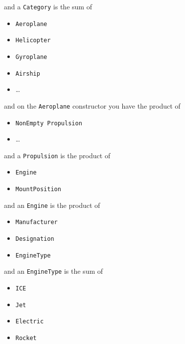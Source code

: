 \begin{frame}
\begin{center}
and a \lstinline{Category} is the sum of
\end{center}
\begin{itemize}
\item \lstinline{Aeroplane}
\item \lstinline{Helicopter}
\item \lstinline{Gyroplane}
\item \lstinline{Airship}
\item \ldots
\end{itemize}
\end{frame}

\begin{frame}
\begin{center}
and on the \lstinline{Aeroplane} constructor you have the product of
\end{center}
\begin{itemize}
\item \lstinline{NonEmpty Propulsion}
\item \ldots
\end{itemize}
\end{frame}

\begin{frame}
\begin{center}
and a \lstinline{Propulsion} is the product of
\end{center}
\begin{itemize}
\item \lstinline{Engine}
\item \lstinline{MountPosition}
\end{itemize}
\end{frame}

\begin{frame}
\begin{center}
and an \lstinline{Engine} is the product of
\end{center}
\begin{itemize}
\item \lstinline{Manufacturer}
\item \lstinline{Designation}
\item \lstinline{EngineType}
\end{itemize}
\end{frame}

\begin{frame}
\begin{center}
and an \lstinline{EngineType} is the sum of
\end{center}
\begin{itemize}
\item \lstinline{ICE}
\item \lstinline{Jet}
\item \lstinline{Electric}
\item \lstinline{Rocket}
\end{itemize}
\end{frame}

